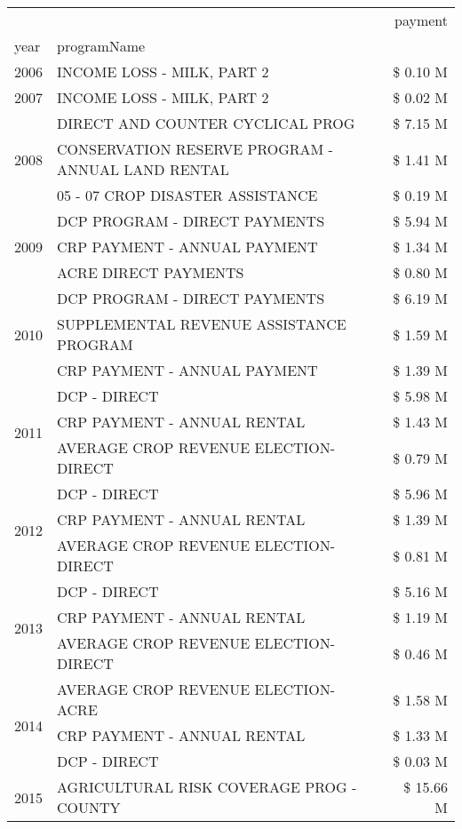 \begin{tabular}{llr}
\toprule
 &  & payment \\
year & programName &  \\
\midrule
2006 & INCOME LOSS - MILK, PART 2 & \$ 0.10 M \\
\cline{1-3}
2007 & INCOME LOSS - MILK, PART 2 & \$ 0.02 M \\
\cline{1-3}
\multirow[t]{3}{*}{2008} & DIRECT AND COUNTER CYCLICAL PROG & \$ 7.15 M \\
 & CONSERVATION RESERVE PROGRAM - ANNUAL LAND RENTAL & \$ 1.41 M \\
 & 05 - 07 CROP DISASTER ASSISTANCE & \$ 0.19 M \\
\cline{1-3}
\multirow[t]{3}{*}{2009} & DCP PROGRAM - DIRECT PAYMENTS & \$ 5.94 M \\
 & CRP PAYMENT - ANNUAL PAYMENT & \$ 1.34 M \\
 & ACRE DIRECT PAYMENTS & \$ 0.80 M \\
\cline{1-3}
\multirow[t]{3}{*}{2010} & DCP PROGRAM - DIRECT PAYMENTS & \$ 6.19 M \\
 & SUPPLEMENTAL REVENUE ASSISTANCE PROGRAM & \$ 1.59 M \\
 & CRP PAYMENT - ANNUAL PAYMENT & \$ 1.39 M \\
\cline{1-3}
\multirow[t]{3}{*}{2011} & DCP - DIRECT & \$ 5.98 M \\
 & CRP PAYMENT - ANNUAL RENTAL & \$ 1.43 M \\
 & AVERAGE CROP REVENUE ELECTION-DIRECT & \$ 0.79 M \\
\cline{1-3}
\multirow[t]{3}{*}{2012} & DCP - DIRECT & \$ 5.96 M \\
 & CRP PAYMENT - ANNUAL RENTAL & \$ 1.39 M \\
 & AVERAGE CROP REVENUE ELECTION-DIRECT & \$ 0.81 M \\
\cline{1-3}
\multirow[t]{3}{*}{2013} & DCP - DIRECT & \$ 5.16 M \\
 & CRP PAYMENT - ANNUAL RENTAL & \$ 1.19 M \\
 & AVERAGE CROP REVENUE ELECTION-DIRECT & \$ 0.46 M \\
\cline{1-3}
\multirow[t]{3}{*}{2014} & AVERAGE CROP REVENUE ELECTION-ACRE & \$ 1.58 M \\
 & CRP PAYMENT - ANNUAL RENTAL & \$ 1.33 M \\
 & DCP - DIRECT & \$ 0.03 M \\
\cline{1-3}
\multirow[t]{3}{*}{2015} & AGRICULTURAL RISK COVERAGE PROG - COUNTY & \$ 15.66 M \\

\end{tabular}
